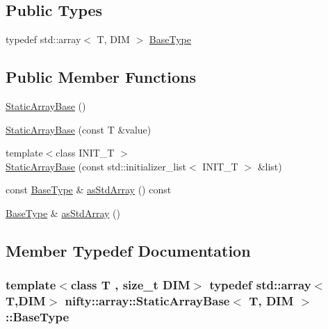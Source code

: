 \subsection*{Public Types}
\begin{DoxyCompactItemize}
\item 
typedef std\+::array$<$ T, D\+I\+M $>$ \hyperlink{classnifty_1_1array_1_1StaticArrayBase_a3f376d2a24fad3a47021c36657494759}{Base\+Type}
\end{DoxyCompactItemize}
\subsection*{Public Member Functions}
\begin{DoxyCompactItemize}
\item 
\hyperlink{classnifty_1_1array_1_1StaticArrayBase_ab15a9b2d0259a54795ffc5aac8d62e50}{Static\+Array\+Base} ()
\item 
\hyperlink{classnifty_1_1array_1_1StaticArrayBase_aa798253fef388d6c0d0fd3d436784e79}{Static\+Array\+Base} (const T \&value)
\item 
{\footnotesize template$<$class I\+N\+I\+T\+\_\+\+T $>$ }\\\hyperlink{classnifty_1_1array_1_1StaticArrayBase_a6d8d83f91ab1ba26d94d9a5915f98bb0}{Static\+Array\+Base} (const std\+::initializer\+\_\+list$<$ I\+N\+I\+T\+\_\+\+T $>$ \&list)
\item 
const \hyperlink{classnifty_1_1array_1_1StaticArrayBase_a3f376d2a24fad3a47021c36657494759}{Base\+Type} \& \hyperlink{classnifty_1_1array_1_1StaticArrayBase_ad4a33e73ab03d344489c81af7108773d}{as\+Std\+Array} () const 
\item 
\hyperlink{classnifty_1_1array_1_1StaticArrayBase_a3f376d2a24fad3a47021c36657494759}{Base\+Type} \& \hyperlink{classnifty_1_1array_1_1StaticArrayBase_a205328f2e3ad922e007afe0f9f3e819b}{as\+Std\+Array} ()
\end{DoxyCompactItemize}


\subsection{Member Typedef Documentation}
\hypertarget{classnifty_1_1array_1_1StaticArrayBase_a3f376d2a24fad3a47021c36657494759}{}
\subsubsection[{Base\+Type}]{\setlength{\rightskip}{0pt plus 5cm}template$<$class T , size\+\_\+t D\+I\+M$>$ typedef std\+::array$<$T,D\+I\+M$>$ {\bf nifty\+::array\+::\+Static\+Array\+Base}$<$ T, D\+I\+M $>$\+::{\bf Base\+Type}}\label{classnifty_1_1array_1_1StaticArrayBase_a3f376d2a24fad3a47021c36657494759}



